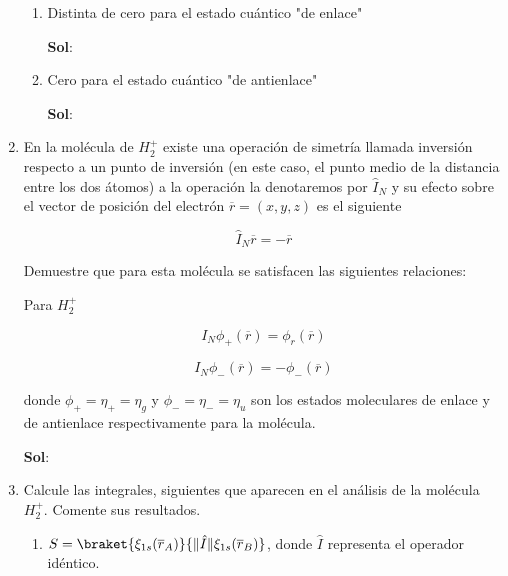 \documentclass[12pt,a4paper]{article}
\providecommand{\norm}[1]{\lVert#1\rVert}
\begin{document}
\begin{enumerate}
\begin{enumerate}
    \item Distinta de cero para el estado cuántico "de enlace"
    
    \textbf{Sol}:
    
    
    \item Cero para el estado cuántico "de antienlace"
    
    \textbf{Sol}:
    
\end{enumerate}







\item En la molécula de $H_{2}^{+}$ existe una operación de simetría llamada inversión respecto a un punto de inversión (en este caso, el punto medio de la distancia entre los dos átomos) a la operación la denotaremos por $\hat{I}_{N}$ y su efecto sobre el vector de posición del electrón $\overline{r}=(x,y,z)$ es el siguiente

\begin{equation*}
    \hat{I}_N \overline{r} = - \overline{r}
\end{equation*}

Demuestre que para esta molécula se satisfacen las siguientes relaciones:

Para $H_{2}^{+}$

\begin{equation*}
    I_N \phi_{+}(\overline{r})= \phi_{r}(\overline{r})
\end{equation*}

\begin{equation*}
    I_N \phi_{-}(\overline{r})=- \phi_{-}(\overline{r})
\end{equation*}

donde $\phi_{+}= \eta_{+}= \eta_{g}$ y $\phi_{-}= \eta_{-}= \eta_{u}$ son los estados moleculares de enlace y de antienlace respectivamente para la molécula.

\textbf{Sol}:









\item Calcule las integrales, siguientes que aparecen en el análisis de la molécula $H_{2}^{+}$. Comente sus resultados.

\begin{enumerate}
    \item $S=\braket{\xi_{1s}(\overline{r}_A)}{\norm{\hat{I}}\xi_{1s}(\overline{r}_B)}$, donde $\hat{I}$ representa el operador idéntico.
    

\end{enumerate}
\end{enumerate}
\end{document}
